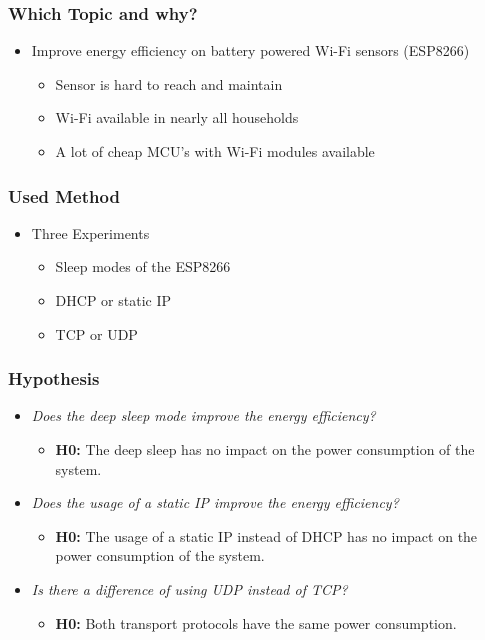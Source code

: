 \begin{frame}
    \frametitle{Which Topic and why?}

    \begin{itemize}

        \item Improve energy efficiency on battery powered Wi-Fi sensors (ESP8266)
              \begin{itemize}
                  \item Sensor is hard to reach and maintain
                  \item Wi-Fi available in nearly all households
                  \item A lot of cheap MCU's with Wi-Fi modules available
              \end{itemize}
    \end{itemize}
\end{frame}

\begin{frame}
    \frametitle{Used Method}

    \begin{itemize}
        \item Three Experiments
              \begin{itemize}
                  \item Sleep modes of the ESP8266
                  \item DHCP or static IP
                  \item TCP or UDP
              \end{itemize}
    \end{itemize}
\end{frame}


\begin{frame}
    \frametitle{Hypothesis}

    \begin{itemize}
        \item \textit{Does the deep sleep mode improve the energy efficiency?}
        \begin{itemize}
            \item \textbf{H0:} The deep sleep has no impact on the power consumption of the system.
        \end{itemize}
        \item \textit{Does the usage of a static IP improve the energy efficiency?}
        \begin{itemize}
            \item \textbf{H0:} The usage of a static IP instead of DHCP has no impact on the power consumption of the system.
        \end{itemize}
        \item \textit{Is there a difference of using UDP instead of TCP?}
        \begin{itemize}
            \item \textbf{H0:} Both transport protocols have the same power consumption. 
        \end{itemize}
    \end{itemize}
\end{frame}
